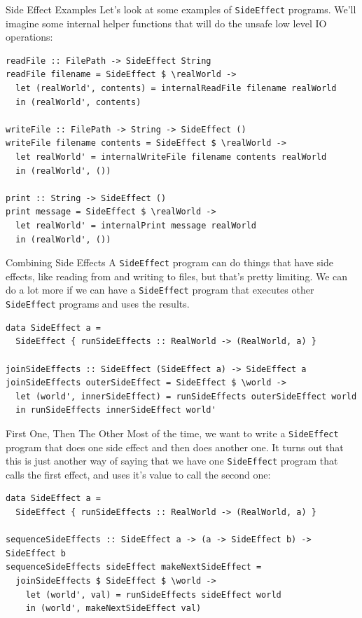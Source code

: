 \documentclass[10pt, presentation, colorlinks]{beamer}
\begin{document}
\begin{frame}[label={sec:org6847513},fragile]{Side Effect Examples}
 Let's look at some examples of \texttt{SideEffect} programs. We'll imagine
some internal helper functions that will do the unsafe low level IO
operations:

\begin{verbatim}
readFile :: FilePath -> SideEffect String
readFile filename = SideEffect $ \realWorld ->
  let (realWorld', contents) = internalReadFile filename realWorld
  in (realWorld', contents)

writeFile :: FilePath -> String -> SideEffect ()
writeFile filename contents = SideEffect $ \realWorld ->
  let realWorld' = internalWriteFile filename contents realWorld
  in (realWorld', ())

print :: String -> SideEffect ()
print message = SideEffect $ \realWorld ->
  let realWorld' = internalPrint message realWorld
  in (realWorld', ())
\end{verbatim}
\end{frame}

\begin{frame}[label={sec:orgff5839f},fragile]{Combining Side Effects}
 A \texttt{SideEffect} program can do things that have side effects, like
reading from and writing to files, but that's pretty limiting. We can
do a lot more if we can have a \texttt{SideEffect} program that executes
other \texttt{SideEffect} programs and uses the results.

\begin{verbatim}
data SideEffect a =
  SideEffect { runSideEffects :: RealWorld -> (RealWorld, a) }

joinSideEffects :: SideEffect (SideEffect a) -> SideEffect a
joinSideEffects outerSideEffect = SideEffect $ \world ->
  let (world', innerSideEffect) = runSideEffects outerSideEffect world
  in runSideEffects innerSideEffect world'
\end{verbatim}
\end{frame}

\begin{frame}[label={sec:org76837b6},fragile]{First One, Then The Other}
 Most of the time, we want to write a \texttt{SideEffect} program that does
one side effect \alert{and then} does another one. It turns out that this is
just another way of saying that we have one \texttt{SideEffect} program that
calls the first effect, and uses it's value to call the second one:

\begin{verbatim}
data SideEffect a =
  SideEffect { runSideEffects :: RealWorld -> (RealWorld, a) }

sequenceSideEffects :: SideEffect a -> (a -> SideEffect b) -> SideEffect b
sequenceSideEffects sideEffect makeNextSideEffect =
  joinSideEffects $ SideEffect $ \world ->
    let (world', val) = runSideEffects sideEffect world
    in (world', makeNextSideEffect val)
\end{verbatim}
\end{frame}
\end{document}
